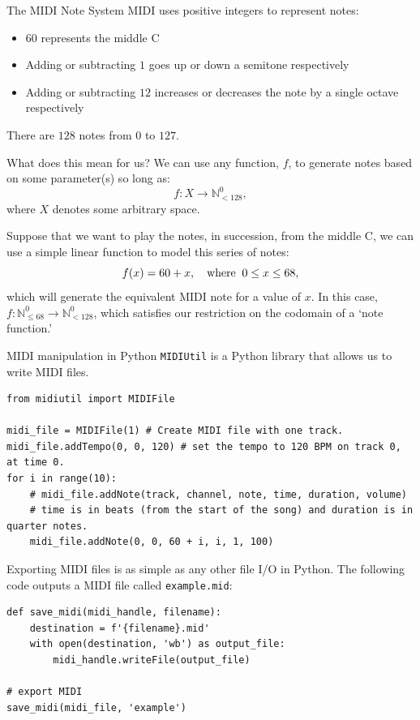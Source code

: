 \documentclass{beamer}
\begin{document}
\begin{frame}{The MIDI Note System}
MIDI uses positive integers to represent notes:
\begin{itemize}
    \item $60$ represents the middle C
    \item Adding or subtracting $1$ goes up or down a semitone respectively
    \item Adding or subtracting $12$ increases or decreases the note by a single octave respectively
\end{itemize}
There are $128$ notes from $0$ to $127$.
\end{frame}

\begin{frame}[allowframebreaks]{What does this mean for us?}
We can use any function, $f$, to generate notes based on some parameter(s) so long as:
\begin{equation*}
    f:X \to \mathbb{N}_{< 128}^{0},
\end{equation*}
where $X$ denotes some arbitrary space.

\framebreak
Suppose that we want to play the notes, in succession, from the middle C, we can use a simple linear function to model this series of notes: 
$$f(x)=60+x,\hspace{1em}\text{where\;\;}0\leq x\leq 68,$$
which will generate the equivalent MIDI note for a value of $x$. In this case, $f:\mathbb{N}^{0}_{\leq 68}\to\mathbb{N}_{<128}^{0}$, which satisfies our restriction on the codomain of a `note function.'
\end{frame}

\begin{frame}{MIDI manipulation in Python}
\texttt{MIDIUtil} is a Python library that allows us to write MIDI files.
\begin{center}
\begin{lstlisting}[language=iPython]
from midiutil import MIDIFile

midi_file = MIDIFile(1) # Create MIDI file with one track.
midi_file.addTempo(0, 0, 120) # set the tempo to 120 BPM on track 0, at time 0.
for i in range(10):
    # midi_file.addNote(track, channel, note, time, duration, volume)
    # time is in beats (from the start of the song) and duration is in quarter notes.
    midi_file.addNote(0, 0, 60 + i, i, 1, 100)
\end{lstlisting}
\end{center}

\framebreak

Exporting MIDI files is as simple as any other file I/O in Python. The following code outputs a MIDI file called \texttt{example.mid}:
\begin{center}
\begin{lstlisting}[language=iPython]
def save_midi(midi_handle, filename):
    destination = f'{filename}.mid'
    with open(destination, 'wb') as output_file:
        midi_handle.writeFile(output_file)
        
# export MIDI
save_midi(midi_file, 'example')
\end{lstlisting}
\end{center}
\end{frame}
\end{document}
